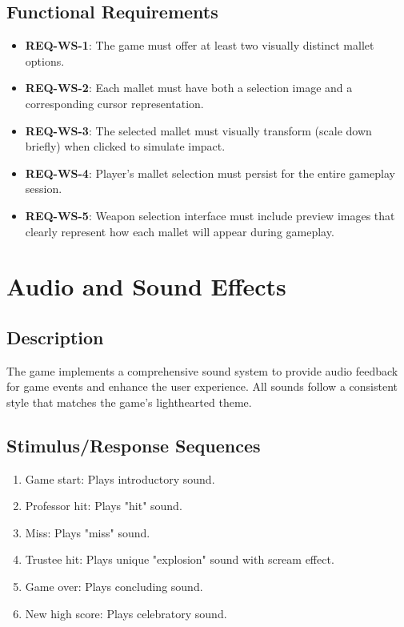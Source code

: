 \documentclass[11pt]{scrreprt}
\begin{document}
\subsection{Functional Requirements}
\begin{itemize}
  \item \textbf{REQ-WS-1}: The game must offer at least two visually distinct mallet options.
  \item \textbf{REQ-WS-2}: Each mallet must have both a selection image and a corresponding cursor representation.
  \item \textbf{REQ-WS-3}: The selected mallet must visually transform (scale down briefly) when clicked to simulate impact.
  \item \textbf{REQ-WS-4}: Player's mallet selection must persist for the entire gameplay session.
  \item \textbf{REQ-WS-5}: Weapon selection interface must include preview images that clearly represent how each mallet will appear during gameplay.
\end{itemize}

\section{Audio and Sound Effects}

\subsection{Description}
The game implements a comprehensive sound system to provide audio feedback for game events and enhance the user experience. All sounds follow a consistent style that matches the game's lighthearted theme.

\subsection{Stimulus/Response Sequences}
\begin{enumerate}
  \item Game start: Plays introductory sound.
  \item Professor hit: Plays "hit" sound.
  \item Miss: Plays "miss" sound.
  \item Trustee hit: Plays unique "explosion" sound with scream effect.
  \item Game over: Plays concluding sound.
  \item New high score: Plays celebratory sound.
\end{enumerate}
\end{document}

